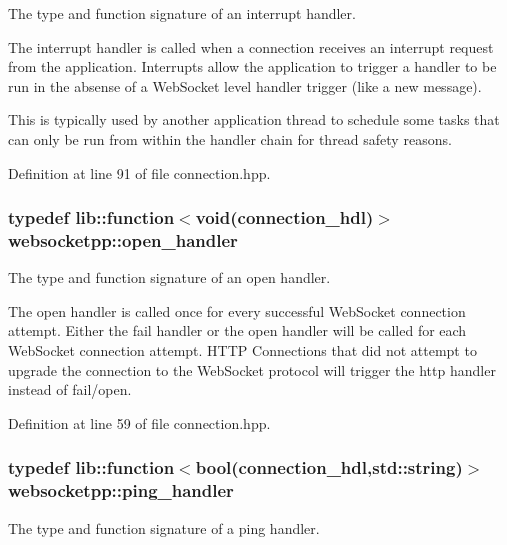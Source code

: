 The type and function signature of an interrupt handler. 

The interrupt handler is called when a connection receives an interrupt request from the application. Interrupts allow the application to trigger a handler to be run in the absense of a Web\+Socket level handler trigger (like a new message).

This is typically used by another application thread to schedule some tasks that can only be run from within the handler chain for thread safety reasons. 

Definition at line 91 of file connection.\+hpp.

\hypertarget{namespacewebsocketpp_a53c8b4ae59cf13b5f883b119bbd14d72}{}
\subsubsection[{open\+\_\+handler}]{\setlength{\rightskip}{0pt plus 5cm}typedef lib\+::function$<$void({\bf connection\+\_\+hdl})$>$ {\bf websocketpp\+::open\+\_\+handler}}\label{namespacewebsocketpp_a53c8b4ae59cf13b5f883b119bbd14d72}


The type and function signature of an open handler. 

The open handler is called once for every successful Web\+Socket connection attempt. Either the fail handler or the open handler will be called for each Web\+Socket connection attempt. H\+T\+T\+P Connections that did not attempt to upgrade the connection to the Web\+Socket protocol will trigger the http handler instead of fail/open. 

Definition at line 59 of file connection.\+hpp.

\hypertarget{namespacewebsocketpp_a9dcaaa7370865f1bcacb55ae715793ef}{}
\subsubsection[{ping\+\_\+handler}]{\setlength{\rightskip}{0pt plus 5cm}typedef lib\+::function$<$bool({\bf connection\+\_\+hdl},std\+::string)$>$ {\bf websocketpp\+::ping\+\_\+handler}}\label{namespacewebsocketpp_a9dcaaa7370865f1bcacb55ae715793ef}


The type and function signature of a ping handler. 


